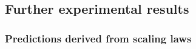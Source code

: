 \begin{appendix}




\subsection{Further experimental results}
\label{sec:appendix:exp_further_results}

\subsubsection{Predictions derived from scaling laws}
\label{sec:appendix:predictions}


\end{appendix}
